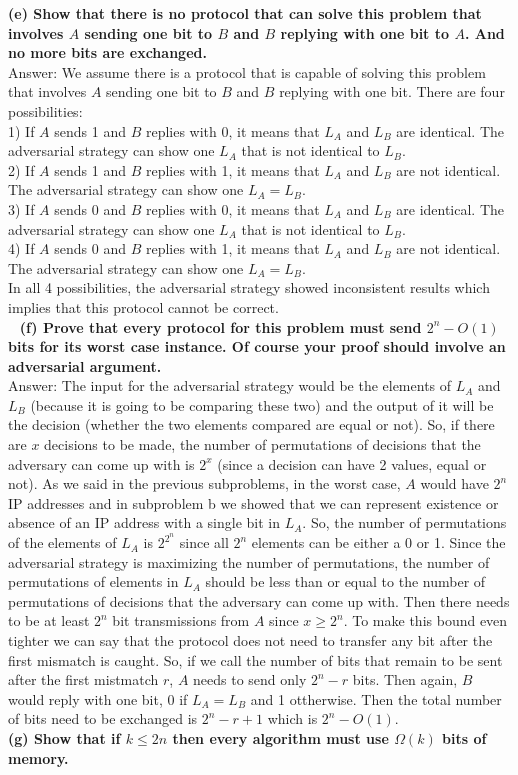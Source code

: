 \documentclass{article}
\begin{document}
\textbf{(e) Show that there is no protocol that can solve this problem that involves $A$ sending one bit to $B$ and $B$ replying with one bit to $A$. And no more bits are exchanged.} \\ \newline
Answer: We assume there is a protocol that is capable of solving this problem that involves $A$ sending one bit to $B$ and $B$ replying with one bit. There are four possibilities: \\
1) If $A$ sends 1 and $B$ replies with 0, it means that $L_A$ and $L_B$ are identical. The adversarial strategy can show one $L_A$ that is not identical to $L_B$. \\
2) If $A$ sends 1 and $B$ replies with 1, it means that $L_A$ and $L_B$ are not identical. The adversarial strategy can show one $L_A = L_B$. \\
3) If $A$ sends 0 and $B$ replies with 0, it means that $L_A$ and $L_B$ are identical. The adversarial strategy can show one $L_A$ that is not identical to $L_B$. \\
4) If $A$ sends 0 and $B$ replies with 1, it means that $L_A$ and $L_B$ are not identical. The adversarial strategy can show one $L_A = L_B$. \\
In all 4 possibilities, the adversarial strategy showed inconsistent results which implies that this protocol cannot be correct. \\ \newline
\textbf{(f) Prove that every protocol for this problem must send $2^n - O(1)$ bits for its worst case instance. Of course your proof should involve an adversarial argument.} \\ \newline
Answer: The input for the adversarial strategy would be the elements of $L_A$ and $L_B$ (because it is going to be comparing these two) and the output of it will be the decision (whether the two elements compared are equal or not). So, if there are $x$ decisions to be made, the number of permutations of decisions that the adversary can come up with is $2^x$ (since a decision can have 2 values, equal or not). As we said in the previous subproblems, in the worst case, $A$ would have $2^n$ IP addresses and in subproblem b we showed that we can represent existence or absence of an IP address with a single bit in $L_A$. So, the number of permutations of the elements of $L_A$ is $2^{2^n}$ since all $2^n$ elements can be either a 0 or 1. Since the adversarial strategy is maximizing the number of permutations, the number of permutations of elements in $L_A$ should be less than or equal to the number of permutations of decisions that the adversary can come up with. Then there needs to be at least $2^n$ bit transmissions from $A$ since $x \geq 2^n$. To make this bound even tighter we can say that the protocol does not need to transfer any bit after the first mismatch is caught. So, if we call the number of bits that remain to be sent after the first mistmatch $r$, $A$ needs to send only $2^n - r$ bits. Then again, $B$ would reply with one bit, 0 if $L_A = L_B$ and 1 ottherwise. Then the total number of bits need to be exchanged is $2^n - r + 1$ which is $2^n - O(1)$. \\ \newline
\textbf{(g) Show that if $k\leq 2n$ then every algorithm must use $\Omega(k)$ bits of memory.} \\ \newline
\end{document}
